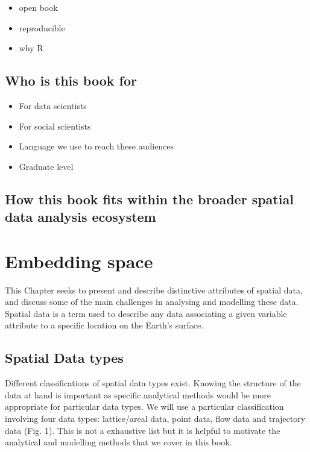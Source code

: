\documentclass[
  letterpaper,
  krantz2]{style/krantz}
\begin{document}
\begin{itemize}
\item
  open book
\item
  reproducible
\item
  why R
\end{itemize}

\hypertarget{who-is-this-book-for}{%
\section{Who is this book for}\label{who-is-this-book-for}}

\begin{itemize}
\item
  For data scientists
\item
  For social scientists
\item
  Language we use to reach these audiences
\item
  Graduate level
\end{itemize}

\hypertarget{how-this-book-fits-within-the-broader-spatial-data-analysis-ecosystem}{%
\section{How this book fits within the broader spatial data analysis
ecosystem}\label{how-this-book-fits-within-the-broader-spatial-data-analysis-ecosystem}}

\hypertarget{embedding-space}{%
\chapter{Embedding space}\label{embedding-space}}

This Chapter seeks to present and describe distinctive attributes of
spatial data, and discuss some of the main challenges in analysing and
modelling these data. Spatial data is a term used to describe any data
associating a given variable attribute to a specific location on the
Earth's surface.

\hypertarget{spatial-data-types}{%
\section{Spatial Data types}\label{spatial-data-types}}

Different classifications of spatial data types exist. Knowing the
structure of the data at hand is important as specific analytical
methods would be more appropriate for particular data types. We will use
a particular classification involving four data types: lattice/areal
data, point data, flow data and trajectory data (Fig. 1). This is not a
exhaustive list but it is helpful to motivate the analytical and
modelling methods that we cover in this book.
\end{document}
